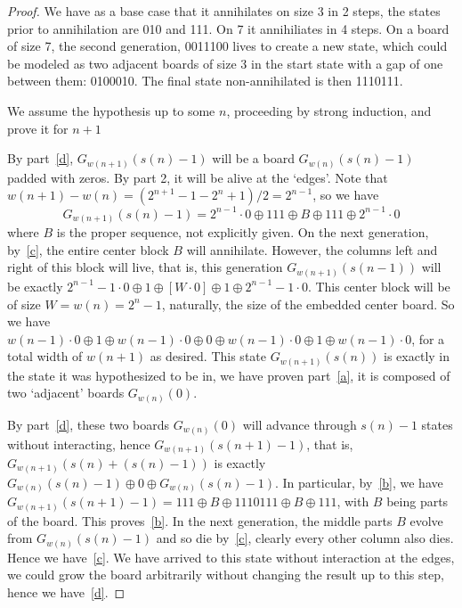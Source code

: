 \documentclass[12pt,letterpaper]{article}
\begin{document}
\begin{proof}
We have as a base case that it annihilates on size 3 in 2 steps, the states prior to annihilation are 010 and 111. On 7 it annihiliates in 4 steps. On a board of size 7, the second generation, 0011100 lives to create a new state, which could be modeled as two adjacent boards of size 3 in the start state with a gap of one between them: 0100010. The final state non-annihilated is then 1110111.

We assume the hypothesis up to some $n$, proceeding by strong induction, and prove it for $n+1$

By part~\ref{d}, $G_{w(n+1)}(s(n)-1)$ will be a board $G_{w(n)}(s(n)-1)$ padded with zeros. By part 2, it will be alive at the `edges'. Note that $w(n+1)-w(n)=(2^{n+1}-1-2^{n}+1)/2=2^{n-1}$, so we have
$$G_{w(n+1)}(s(n)-1) = 2^{n-1}\cdot 0 \oplus 111 \oplus B \oplus 111 \oplus 2^{n-1}\cdot 0$$
where $B$ is the proper sequence, not explicitly given. On the next generation, by~\ref{c}, the entire center block $B$ will annihilate. However, the columns left and right of this block will live, that is, this generation $G_{w(n+1)}(s(n-1))$ will be exactly $2^{n-1}-1\cdot 0 \oplus 1 \oplus [W\cdot 0]\oplus 1 \oplus 2^{n-1}-1\cdot 0$. This center block will be of size $W=w(n)=2^n-1$, naturally, the size of the embedded center board. So we have $w(n-1)\cdot 0\oplus 1 \oplus w(n-1)\cdot 0\oplus 0 \oplus w(n-1)\cdot 0\oplus 1\oplus w(n-1)\cdot 0$, for a total width of $w(n+1)$ as desired. This state $G_{w(n+1)}(s(n))$ is exactly in the state it was hypothesized to be in, we have proven part~\ref{a}, it is composed of two `adjacent' boards $G_{w(n)}(0)$.

By part~\ref{d}, these two boards $G_{w(n)}(0)$ will advance through $s(n)-1$ states without interacting, hence $G_{w(n+1)}(s(n+1)-1)$, that is, $G_{w(n+1)}(s(n)+(s(n)-1))$ is exactly $G_{w(n)}(s(n)-1) \oplus 0 \oplus G_{w(n)}(s(n)-1)$. In particular, by~\ref{b}, we have $G_{w(n+1)}(s(n+1)-1) = 111 \oplus B \oplus 1110111 \oplus B \oplus 111$, with $B$ being parts of the board. This proves~\ref{b}. In the next generation, the middle parts $B$ evolve from $G_{w(n)}(s(n)-1)$ and so die by~\ref{c}, clearly every other column also dies. Hence we have~\ref{c}. We have arrived to this state without interaction at the edges, we could grow the board arbitrarily without changing the result up to this step, hence we have~\ref{d}.

\end{proof}
\end{document}
